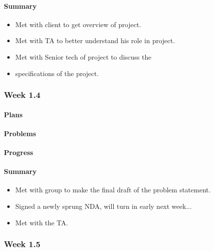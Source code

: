 \documentclass[onecolumn, draftclsnofoot,10pt, compsoc]{article}
\begin{document}
		    \paragraph{Summary} \hfill \break
		    	\begin{itemize}
		        \item Met with client to get overview of project.
                \item Met with TA to better understand his role in project.
                \item Met with Senior tech of project to discuss the \item specifications of the project.
                \end{itemize}

		\subsubsection{Week 1.4}
			\paragraph{Plans} \hfill \break

		    \paragraph{Problems} \hfill \break

		    \paragraph{Progress} \hfill \break

		    \paragraph{Summary}
		    	\begin{itemize}
		            \item Met with group to make the final draft of the problem statement.
                    \item Signed a newly sprung NDA, will turn in early next week...
                    \item  Met with the TA.
                \end{itemize}


		\subsubsection{Week 1.5}
\end{document}

